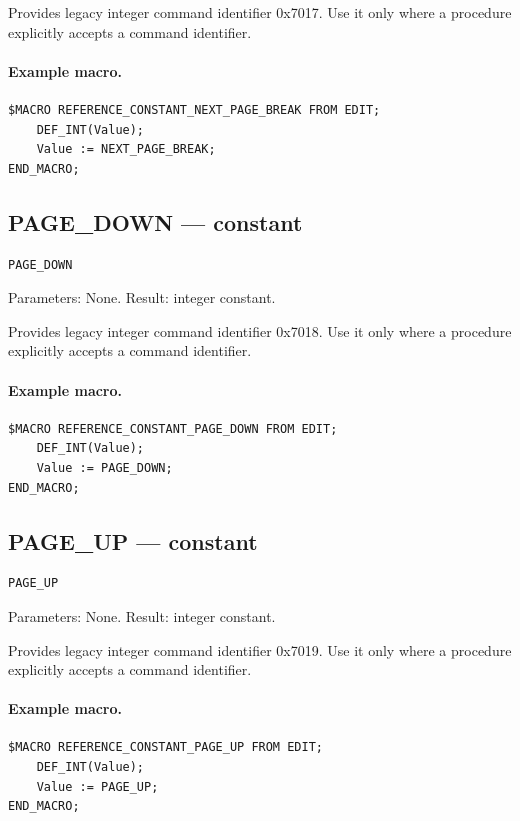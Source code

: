 \documentclass[a4paper,10pt,twoside,openany]{book}
\begin{document}
Provides legacy integer command identifier 0x7017. Use it only where a procedure explicitly accepts a command identifier.

\paragraph{Example macro.}
\begin{verbatim}
$MACRO REFERENCE_CONSTANT_NEXT_PAGE_BREAK FROM EDIT;
    DEF_INT(Value);
    Value := NEXT_PAGE_BREAK;
END_MACRO;
\end{verbatim}

\label{prim:constant-page-down}
\subsection*{PAGE\_DOWN --- constant}
\begin{verbatim}
PAGE_DOWN
\end{verbatim}
Parameters: None. Result: integer constant.

Provides legacy integer command identifier 0x7018. Use it only where a procedure explicitly accepts a command identifier.

\paragraph{Example macro.}
\begin{verbatim}
$MACRO REFERENCE_CONSTANT_PAGE_DOWN FROM EDIT;
    DEF_INT(Value);
    Value := PAGE_DOWN;
END_MACRO;
\end{verbatim}

\label{prim:constant-page-up}
\subsection*{PAGE\_UP --- constant}
\begin{verbatim}
PAGE_UP
\end{verbatim}
Parameters: None. Result: integer constant.

Provides legacy integer command identifier 0x7019. Use it only where a procedure explicitly accepts a command identifier.

\paragraph{Example macro.}
\begin{verbatim}
$MACRO REFERENCE_CONSTANT_PAGE_UP FROM EDIT;
    DEF_INT(Value);
    Value := PAGE_UP;
END_MACRO;
\end{verbatim}
\end{document}
